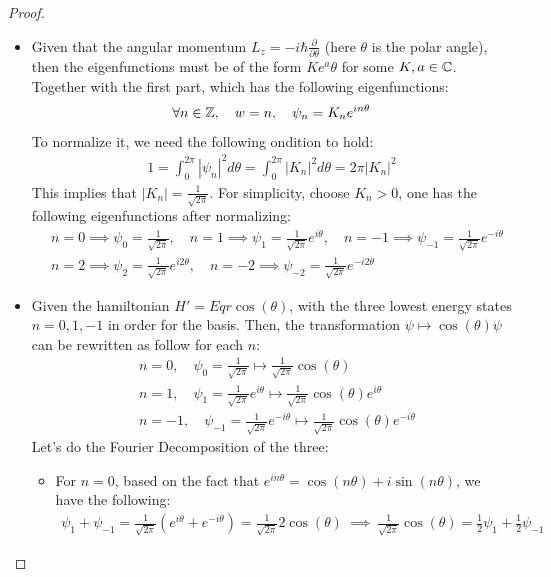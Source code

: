 \documentclass{article}
\begin{document}
\begin{proof}
\begin{itemize}
        \item[(b)] Given that the angular momentum $L_z = -i\hbar\frac{\partial}{\partial\theta}$ (here $\theta$ is the polar angle), then the eigenfunctions must be of the form $Ke^a\theta$ for some $K,a \in\mathbb{C}$. Together with the first part, which has the following eigenfunctions:
        \begin{align}
            \forall n\in\mathbb{Z},\quad w=n, \quad \psi_n = K_n e^{in\theta}
        \end{align}
        To normalize it, we need the following ondition to hold:
        \begin{align}
            1=\int_{0}^{2\pi}|\psi_n|^2d\theta = \int_{0}^{2\pi}|K_n|^2 d\theta = 2\pi|K_n|^2
        \end{align}
        This implies that $|K_n| = \frac{1}{\sqrt{2\pi}}$. For simplicity, choose $K_n>0$, one has the following eigenfunctions after normalizing:
        \begin{align}
            &n=0\implies \psi_0 = \frac{1}{\sqrt{2\pi}},\quad n=1\implies \psi_1=\frac{1}{\sqrt{2\pi}}e^{i\theta},\quad n=-1\implies \psi_{-1}=\frac{1}{\sqrt{2\pi}}e^{-i\theta}\\
            &n=2\implies \psi_2=\frac{1}{\sqrt{2\pi}}e^{i2\theta},\quad n=-2\implies \psi_{-2}=\frac{1}{\sqrt{2\pi}}e^{-i2\theta}
        \end{align}

        \hfil

        \item[(c)] Given the hamiltonian $H' = Eqr\cos(\theta)$, with the three lowest energy states $n=0,1,-1$ in order for the basis. Then, the transformation $\psi \mapsto \cos(\theta)\psi$ can be rewritten as follow for each $n$:
        \begin{align}
            &n=0,\quad \psi_0 = \frac{1}{\sqrt{2\pi}}\mapsto \frac{1}{\sqrt{2\pi}}\cos(\theta)\\
            &n=1,\quad \psi_1 = \frac{1}{\sqrt{2\pi}}e^{i\theta}\mapsto \frac{1}{\sqrt{2\pi}}\cos(\theta)e^{i\theta}\\
            &n=-1,\quad \psi_{-1} = \frac{1}{\sqrt{2\pi}}e^{-i\theta}\mapsto \frac{1}{\sqrt{2\pi}}\cos(\theta)e^{-i\theta}
        \end{align}
        Let's do the Fourier Decomposition of the three:
        \begin{itemize}
            \item For $n=0$, based on the fact that $e^{in\theta}=\cos(n\theta)+i\sin(n\theta)$, we have the following:
            \begin{align}
                \psi_1+\psi_{-1} = \frac{1}{\sqrt{2\pi}}(e^{i\theta}+e^{-i\theta})=\frac{1}{\sqrt{2\pi}}2\cos(\theta)\ \implies\ \frac{1}{\sqrt{2\pi}}\cos(\theta)=\frac{1}{2}\psi_1+\frac{1}{2}\psi_{-1}
            \end{align}


\end{itemize}
\end{itemize}
\end{proof}
\end{document}
